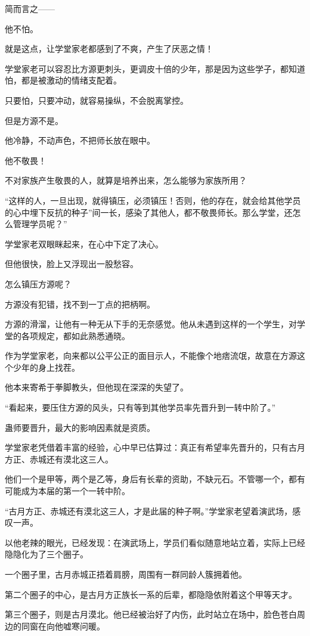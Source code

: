 \begin{this_body}
简而言之——

他不怕。

就是这点，让学堂家老都感到了不爽，产生了厌恶之情！

学堂家老可以容忍比方源更刺头，更调皮十倍的少年，那是因为这些学子，都知道怕，都是被激动的情绪支配着。

只要怕，只要冲动，就容易操纵，不会脱离掌控。

但是方源不是。

他冷静，不动声色，不把师长放在眼中。

他不敬畏！

不对家族产生敬畏的人，就算是培养出来，怎么能够为家族所用？

“这样的人，一旦出现，就得镇压，必须镇压！否则，他的存在，就会给其他学员的心中埋下反抗的种子”间一长，感染了其他人，都不敬畏师长。那么学堂，还怎么管理学员呢？”

学堂家老双眼眯起来，在心中下定了决心。

但他很快，脸上又浮现出一股愁容。

怎么镇压方源呢？

方源没有犯错，找不到一丁点的把柄啊。

方源的滑溜，让他有一种无从下手的无奈感觉。他从未遇到这样的一个学生，对学堂的各项规定，都如此熟悉通晓。

作为学堂家老，向来都以公平公正的面目示人，不能像个地痞流氓，故意在方源这个少年的身上找茬。

他本来寄希于拳脚教头，但他现在深深的失望了。

“看起来，要压住方源的风头，只有等到其他学员率先晋升到一转中阶了。”

蛊师要晋升，最大的影响因素就是资质。

学堂家老凭借着丰富的经验，心中早已估算过：真正有希望率先晋升的，只有古月方正、赤城还有漠北这三人。

他们一个是甲等，两个是乙等，身后有长辈的资助，不缺元石。不管哪一个，都有可能成为本届的第一个一转中阶。

“古月方正、赤城还有漠北这三人，才是此届的种子啊。”学堂家老望着演武场，感叹一声。

以他老辣的眼光，已经发现：在演武场上，学员们看似随意地站立着，实际上已经隐隐化为了三个圈子。

一个圈子里，古月赤城正捂着肩膀，周围有一群同龄人簇拥着他。

第二个圈子的中心，是古月方正族长一系的后辈，都隐隐依附着这个甲等天才。

第三个圈子，则是古月漠北。他已经被治好了内伤，此时站立在场中，脸色苍白周边的同窗在向他嘘寒问暖。


\end{this_body}
